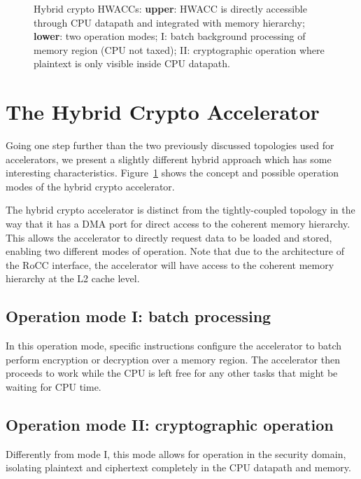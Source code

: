 \documentclass[10pt,conference]{IEEEtran}
\begin{document}
\begin{figure}
  \centering
  \caption{Hybrid crypto HWACCs: \textbf{upper}: HWACC is directly accessible through CPU datapath and
    integrated with memory hierarchy; \textbf{lower}: two operation modes; I: batch
    background processing of memory region (CPU not taxed); II: cryptographic
    operation where plaintext is only visible inside CPU datapath.}
  \label{fig:hybrid}
\end{figure}

\section{The Hybrid Crypto Accelerator}

Going one step further than the two previously discussed topologies used for
accelerators, we present a slightly different hybrid approach which has
some interesting characteristics. Figure~\ref{fig:hybrid} shows the concept and
possible operation modes of the hybrid crypto accelerator.

The hybrid crypto accelerator is distinct from the tightly-coupled topology in
the way that it has a DMA port for direct access to the coherent memory
hierarchy. This allows the accelerator to directly request data to be loaded and
stored, enabling two different modes of operation. Note that due to the
architecture of the RoCC interface, the accelerator will have access to the
coherent memory hierarchy at the L2 cache level.

\subsection{Operation mode I: batch processing}

In this operation mode, specific instructions configure the accelerator to
batch perform encryption or decryption over a memory region. The accelerator
then proceeds to work while the CPU is left free for any other tasks that might
be waiting for CPU time.


\subsection{Operation mode II: cryptographic operation}

Differently from mode I, this mode allows for operation in the security domain,
isolating plaintext and ciphertext completely in the CPU datapath and memory.
\end{document}
